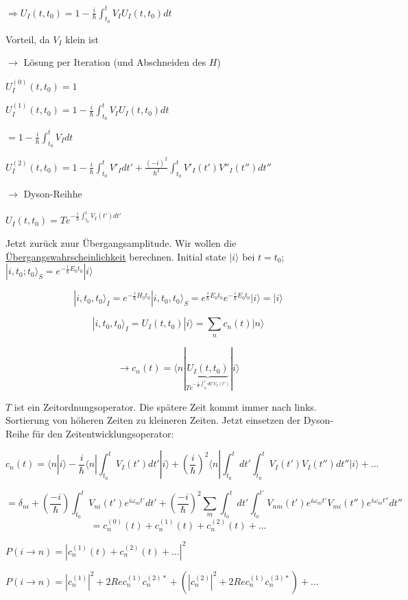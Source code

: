 \(\Rightarrow U_I(t,t_0) = 1 - \frac{i}{\hbar} \int_{t_0}^{t}V_IU_I(t,t_0)dt\)

Vorteil, da \(V_I\) klein ist

\(\rightarrow\) Lösung per Iteration (und Abschneiden des \(H\))


\(U_I^{(0)}(t,t_0)=1\)

\(U_I^{(1)}(t,t_0)=1 - \frac{i}{\hbar} \int_{t_0}^{t}V_IU_I(t,t_0)dt\)

\( = 1 - \frac{i}{\hbar} \int_{t_0}^{t}V_Idt\)


\(U_I^{(2)}(t,t_0)=1 - \frac{i}{\hbar} \int_{t_0}^{t}V'_Idt' + \frac{(-i)^2}{\hbar^2}\int_{t_0}^{t}V'_I(t')V''_I(t'')dt''\)

\(\rightarrow\) Dyson-Reihhe
  
\(U_I(t,t_0)=T e^{-\frac{i}{\hbar}\int_{t_0}^{t}V_I(t')dt'}\)

Jetzt zurück zuur Übergangsamplitude. Wir wollen die \underline{Übergangswahrscheinlichkeit} berechnen. Initial state \(|i\rangle\) bei \(t=t_0\); \(|i,t_0;t_0\rangle_S = e^{-\frac{i}{\hbar}E_0 t_0}|i\rangle\)

\[ |i,t_0,t_0\rangle_I = e^{-\frac{i}{\hbar}H_0 t_0}|i,t_0,t_0\rangle_S = e^{\frac{i}{\hbar}E_0 t_0}e^{-\frac{i}{\hbar}E_0 t_0}|i\rangle = |i\rangle\]


\[ |i,t_0,t_0\rangle_I = U_I(t,t_0)|i\rangle = \sum_n c_n(t) |n\rangle\]

\[\rightarrow c_n(t) = \langle n|\underbrace{U_I(t,t_0)}_{Te^{-\frac{i}{\hbar}\int_{t_0}^tdt'V_I(t')}}|i\rangle\]

\(T\) ist ein Zeitordnungsoperator. Die spätere Zeit kommt immer nach links. Sortierung von höheren Zeiten zu kleineren Zeiten. Jetzt einsetzen der Dyson-Reihe für den Zeitentwicklungsoperator:

\[ c_n(t) = \langle n|i\rangle - \frac{i}{\hbar}\langle n |\int_{t_0}^t V_I(t')dt'|i\rangle + (\frac{i}{\hbar})^2\langle n |\int_{t_0}^t dt'\int_{t_0}^t V_I(t')V_I(t'')dt'' |i\rangle +...\]

\[ = \delta_{ni}+(\frac{-i}{\hbar})\int_{t_0}^t V_{ni}(t')e^{i\omega_{ni}t'}dt' + (\frac{-i}{\hbar})^2\sum_m\int_{t_0}^tdt'\int_{t_0}^{t'} V_{nm}(t')e^{i\omega_{ni}t'} V_{mi}(t'')e^{i\omega_{ni}t''} dt''\]
\[ = c_n^{(0)}(t)+c_n^{(1)}(t)+c_n^{(2)}(t)+...\]

\(P(i\rightarrow n) = | c_n^{(1)}(t)+c_n^{(2)}(t)+...|^2\)

\(P(i\rightarrow n) = |c_n^{(1)}|^2 + 2Re c_n^{(1)} c_n^{(2)*}+(|c_n^{(2)}|^2 + 2Re c_n^{(1)} c_n^{(3)*})+...\)



